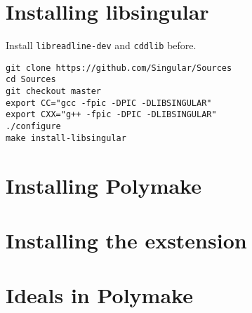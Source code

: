 \documentclass[a4paper]{article}
\begin{document}
\section{Installing libsingular}
Install {\tt libreadline-dev} and {\tt cddlib} before.
\begin{verbatim}
git clone https://github.com/Singular/Sources
cd Sources
git checkout master
export CC="gcc -fpic -DPIC -DLIBSINGULAR"
export CXX="g++ -fpic -DPIC -DLIBSINGULAR"
./configure
make install-libsingular
\end{verbatim}
\section{Installing Polymake}

\section{Installing the exstension}

\section{Ideals in Polymake}
\end{document}
